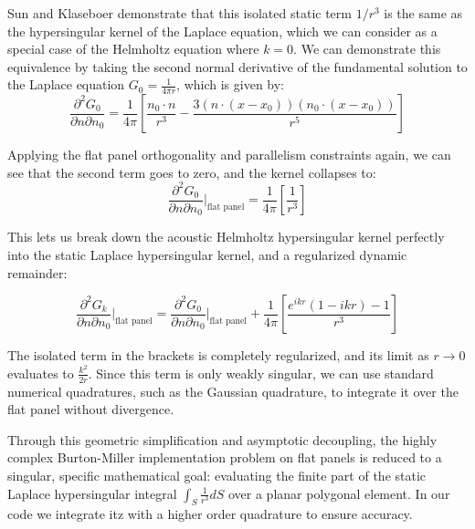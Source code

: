 Sun and Klaseboer \cite{sunnonsingularburtonmiller2023} demonstrate that this isolated static term $1/r^3$ is the same as the hypersingular kernel of the Laplace equation, which we can consider as a special case of the Helmholtz equation where $k = 0$. 
We can demonstrate this equivalence by taking the second normal derivative of the fundamental solution to the Laplace equation $G_0 = \frac{1}{4 \pi r}$, which is given by:
\begin{equation}
    \frac{\partial^2 G_0}{\partial n \partial n_0} = \frac{1}{4\pi} \left[ \frac{n_0 \cdot n}{r^3} - \frac{3(n \cdot (x - x_0))(n_0 \cdot (x - x_0))}{r^5} \right]
\end{equation}

Applying the flat panel orthogonality and parallelism constraints again, we can see that the second term goes to zero, and the kernel collapses to:
\begin{equation}
    \frac{\partial^2 G_0}{\partial n \partial n_0} \bigg|_{\text{flat panel}} =  \frac{1}{4\pi} \left[\frac{1}{r^3} \right]
\end{equation}

This lets us break down the acoustic Helmholtz hypersingular kernel perfectly into the static Laplace hypersingular kernel, and a regularized dynamic remainder:

\begin{equation}
    \frac{\partial^2 G_k}{\partial n \partial n_0} \bigg|_{\text{flat panel}} = \frac{\partial^2 G_0}{\partial n \partial n_0} \bigg|_{\text{flat panel}} + \frac{1}{4\pi} \left[\frac{e^{ikr} (1 - ikr) - 1 }{r^3} \right]
\end{equation}

The isolated term in the brackets is completely regularized, and its limit as $r \to 0$  evaluates to $\frac{k^2}{2r}$. Since this term is only weakly singular, we can use standard numerical quadratures, such as the Gaussian quadrature, to integrate it over the flat panel without divergence.

Through this geometric simplification and asymptotic decoupling, the highly complex Burton-Miller implementation problem on flat panels is reduced to a singular, specific mathematical goal: evaluating the finite part of the static Laplace hypersingular integral $\int_S \frac{1}{r^3} dS$ over a planar polygonal element.
In our code we integrate itz with a higher order quadrature to ensure accuracy.